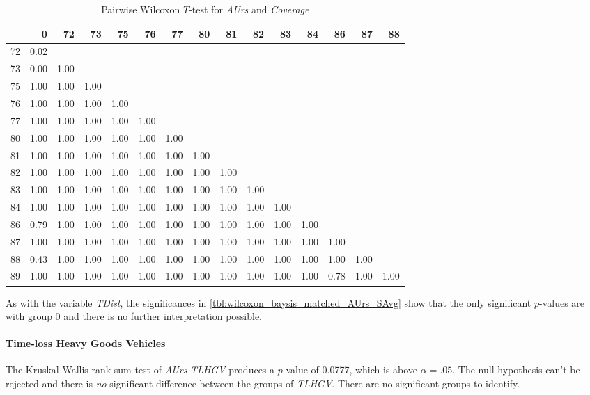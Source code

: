 \begin{table}[ht]
	\tiny
	\centering
    \begin{tabular}{rrrrrrrrrrrrrrr}
        \toprule
        & 0 & 72 & 73 & 75 & 76 & 77 & 80 & 81 & 82 & 83 & 84 & 86 & 87 & 88 \\ 
        \midrule
        72 & 0.02 &  &  &  &  &  &  &  &  &  &  &  &  &  \\ 
        73 & 0.00 & 1.00 &  &  &  &  &  &  &  &  &  &  &  &  \\ 
        75 & 1.00 & 1.00 & 1.00 &  &  &  &  &  &  &  &  &  &  &  \\ 
        76 & 1.00 & 1.00 & 1.00 & 1.00 &  &  &  &  &  &  &  &  &  &  \\ 
        77 & 1.00 & 1.00 & 1.00 & 1.00 & 1.00 &  &  &  &  &  &  &  &  &  \\ 
        80 & 1.00 & 1.00 & 1.00 & 1.00 & 1.00 & 1.00 &  &  &  &  &  &  &  &  \\ 
        81 & 1.00 & 1.00 & 1.00 & 1.00 & 1.00 & 1.00 & 1.00 &  &  &  &  &  &  &  \\ 
        82 & 1.00 & 1.00 & 1.00 & 1.00 & 1.00 & 1.00 & 1.00 & 1.00 &  &  &  &  &  &  \\ 
        83 & 1.00 & 1.00 & 1.00 & 1.00 & 1.00 & 1.00 & 1.00 & 1.00 & 1.00 &  &  &  &  &  \\ 
        84 & 1.00 & 1.00 & 1.00 & 1.00 & 1.00 & 1.00 & 1.00 & 1.00 & 1.00 & 1.00 &  &  &  &  \\ 
        86 & 0.79 & 1.00 & 1.00 & 1.00 & 1.00 & 1.00 & 1.00 & 1.00 & 1.00 & 1.00 & 1.00 &  &  &  \\ 
        87 & 1.00 & 1.00 & 1.00 & 1.00 & 1.00 & 1.00 & 1.00 & 1.00 & 1.00 & 1.00 & 1.00 & 1.00 &  &  \\ 
        88 & 0.43 & 1.00 & 1.00 & 1.00 & 1.00 & 1.00 & 1.00 & 1.00 & 1.00 & 1.00 & 1.00 & 1.00 & 1.00 &  \\ 
        89 & 1.00 & 1.00 & 1.00 & 1.00 & 1.00 & 1.00 & 1.00 & 1.00 & 1.00 & 1.00 & 1.00 & 0.78 & 1.00 & 1.00 \\ 
        \bottomrule
      \end{tabular}
	\caption{Pairwise Wilcoxon $T$-test for \textit{AUrs} and \textit{Coverage}}
	\label{tbl:wilcoxon_baysis_matched_AUrs_Cov}
\end{table}
As with the variable \textit{TDist}, the significances in \cref{tbl:wilcoxon_baysis_matched_AUrs_SAvg} show that the only significant $p$-values are with group 0 and there is no further interpretation possible.

\paragraph{Time-loss Heavy Goods Vehicles}
The Kruskal-Wallis rank sum test of \textit{AUrs}-\textit{TLHGV} produces a $p$-value of 0.0777, which is above $\alpha=.05$. The null hypothesis can't be rejected and there is \textit{no} significant difference between the groups of \textit{TLHGV}. There are no significant groups to identify.


